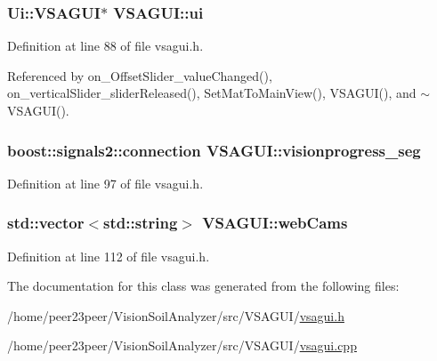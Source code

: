 \hypertarget{class_v_s_a_g_u_i_a7a1d0cb3cf813ff9dce12f7f0ed6cd7a}{}
\subsubsection[{ui}]{\setlength{\rightskip}{0pt plus 5cm}Ui\+::\+V\+S\+A\+G\+U\+I$\ast$ V\+S\+A\+G\+U\+I\+::ui\hspace{0.3cm}{\ttfamily [private]}}\label{class_v_s_a_g_u_i_a7a1d0cb3cf813ff9dce12f7f0ed6cd7a}


Definition at line 88 of file vsagui.\+h.



Referenced by on\+\_\+\+Offset\+Slider\+\_\+value\+Changed(), on\+\_\+vertical\+Slider\+\_\+slider\+Released(), Set\+Mat\+To\+Main\+View(), V\+S\+A\+G\+U\+I(), and $\sim$\+V\+S\+A\+G\+U\+I().

\hypertarget{class_v_s_a_g_u_i_a524d706a05977a319c6381aae3f313de}{}
\subsubsection[{visionprogress\+\_\+seg}]{\setlength{\rightskip}{0pt plus 5cm}boost\+::signals2\+::connection V\+S\+A\+G\+U\+I\+::visionprogress\+\_\+seg\hspace{0.3cm}{\ttfamily [private]}}\label{class_v_s_a_g_u_i_a524d706a05977a319c6381aae3f313de}


Definition at line 97 of file vsagui.\+h.

\hypertarget{class_v_s_a_g_u_i_a1177641d1293c486f77fa62e3c8ed26a}{}
\subsubsection[{web\+Cams}]{\setlength{\rightskip}{0pt plus 5cm}std\+::vector$<$std\+::string$>$ V\+S\+A\+G\+U\+I\+::web\+Cams\hspace{0.3cm}{\ttfamily [private]}}\label{class_v_s_a_g_u_i_a1177641d1293c486f77fa62e3c8ed26a}


Definition at line 112 of file vsagui.\+h.



The documentation for this class was generated from the following files\+:\begin{DoxyCompactItemize}
\item 
/home/peer23peer/\+Vision\+Soil\+Analyzer/src/\+V\+S\+A\+G\+U\+I/\hyperlink{vsagui_8h}{vsagui.\+h}\item 
/home/peer23peer/\+Vision\+Soil\+Analyzer/src/\+V\+S\+A\+G\+U\+I/\hyperlink{vsagui_8cpp}{vsagui.\+cpp}\end{DoxyCompactItemize}
